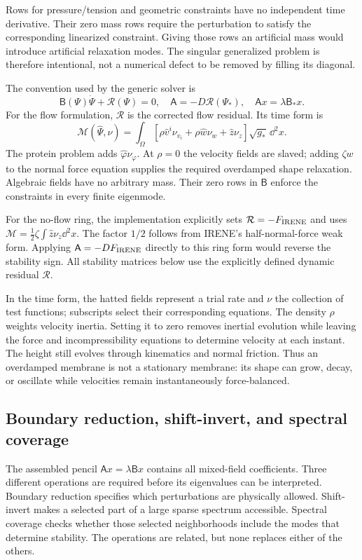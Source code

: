 Rows for pressure/tension and geometric constraints have no independent time derivative. Their zero mass rows require the perturbation to satisfy the corresponding linearized constraint. Giving those rows an artificial mass would introduce artificial relaxation modes. The singular generalized problem is therefore intentional, not a numerical defect to be removed by filling its diagonal.


The convention used by the generic solver is
\begin{equation}
\mathsf B(\Psi)\dot\Psi+\mathcal R(\Psi)=0,\quad
\mathsf A=-D\mathcal R(\Psi_*),\quad \mathsf A x=\lambda\mathsf B_*x.
\end{equation}
For the flow formulation, $\mathcal R$ is the corrected flow residual. Its time form is
\begin{equation}
\mathcal M(\widehat\Psi,\nu)=\int_\Omega
[\rho\widehat v^i\nu_{v_i}+\rho\widehat w\nu_w+\widehat z\nu_z]\sqrt{g_*}\,\dd^2x.
\end{equation}
The protein problem adds $\widehat\varphi\nu_\varphi$. At $\rho=0$ the velocity fields are slaved; adding $\zeta w$ to the normal force equation supplies the required overdamped shape relaxation. Algebraic fields have no arbitrary mass. Their zero rows in $\mathsf B$ enforce the constraints in every finite eigenmode.

For the no-flow ring, the implementation explicitly sets $\mathcal R=-F_{\rm IRENE}$ and uses $\mathcal M=\tfrac12\zeta\int\widehat z\nu_z\dd^2x$. The factor $1/2$ follows from IRENE's half-normal-force weak form. Applying $\mathsf A=-DF_{\rm IRENE}$ directly to this ring form would reverse the stability sign. All stability matrices below use the explicitly defined dynamic residual $\mathcal R$.


In the time form, the hatted fields represent a trial rate and $\nu$ the collection of test functions; subscripts select their corresponding equations. The density $\rho$ weights velocity inertia. Setting it to zero removes inertial evolution while leaving the force and incompressibility equations to determine velocity at each instant. The height still evolves through kinematics and normal friction. Thus an overdamped membrane is not a stationary membrane: its shape can grow, decay, or oscillate while velocities remain instantaneously force-balanced.


\subsection{Boundary reduction, shift-invert, and spectral coverage}
\label{sec:spectral-procedure}
The assembled pencil $\mathsf Ax=\lambda\mathsf Bx$ contains all mixed-field coefficients. Three different operations are required before its eigenvalues can be interpreted. Boundary reduction specifies which perturbations are physically allowed. Shift-invert makes a selected part of a large sparse spectrum accessible. Spectral coverage checks whether those selected neighborhoods include the modes that determine stability. The operations are related, but none replaces either of the others.

